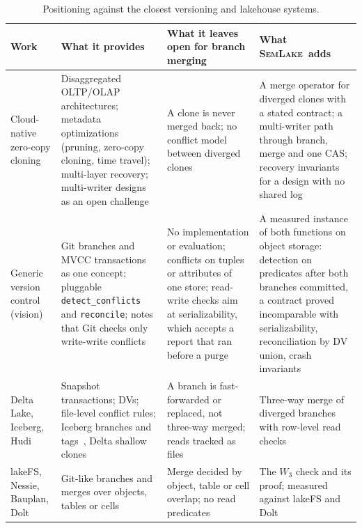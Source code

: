 \documentclass[sigconf, nonacm]{acmart}
\newcommand{\systemname}{\textsc{SemLake}}
\begin{document}
\begin{table}[t]
\centering
\scriptsize
\caption{Positioning against the closest versioning and lakehouse systems.}
\label{tab:novelty}
\renewcommand{\arraystretch}{0.9}
\setlength{\tabcolsep}{2.5pt}
\begin{tabularx}{\textwidth}{p{1.35in}p{1.95in}p{1.75in}X}
\toprule
\textbf{Work} & \textbf{What it provides} & \textbf{What it leaves open for branch merging} & \textbf{What \systemname\ adds} \\
\midrule
Cloud-native zero-copy cloning~\cite{dong2024cloudnative} & Disaggregated OLTP/OLAP architectures; metadata optimizations (pruning, zero-copy cloning, time travel); multi-layer recovery; multi-writer designs as an open challenge & A clone is never merged back; no conflict model between diverged clones & A merge operator for diverged clones with a stated contract; a multi-writer path through branch, merge and one CAS; recovery invariants for a design with no shared log \\
\addlinespace[0.5pt]
Generic version control~\cite{yilmaz2025gvc} (vision) & Git branches and MVCC transactions as one concept; pluggable \texttt{detect\_conflicts} and \texttt{reconcile}; notes that Git checks only write-write conflicts & No implementation or evaluation; conflicts on tuples or attributes of one store; read-write checks aim at serializability, which accepts a report that ran before a purge & A measured instance of both functions on object storage: detection on predicates after both branches committed, a contract proved incomparable with serializability, reconciliation by DV union, crash invariants \\
\addlinespace[0.5pt]
Delta Lake, Iceberg, Hudi~\cite{armbrust2020delta, iceberg2025v3, sumit2026hudi} & Snapshot transactions; DVs; file-level conflict rules; Iceberg branches and tags~\cite{icebergbranching}, Delta shallow clones~\cite{deltaclone} & A branch is fast-forwarded or replaced, not three-way merged; reads tracked as files & Three-way merge of diverged branches with row-level read checks \\
\addlinespace[0.5pt]
lakeFS, Nessie, Bauplan, Dolt~\cite{lakefs, nessie, tagliabue2024bauplan, dolt2026} & Git-like branches and merges over objects, tables or cells & Merge decided by object, table or cell overlap; no read predicates & The $W_3$ check and its proof; measured against lakeFS and Dolt \\
\bottomrule
\end{tabularx}
\end{table}
\end{document}
